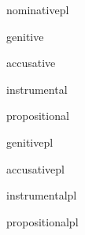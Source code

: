 \newcommand*\glstextfoot[1]{\glstext{#1}\footnote{\glstext{#1} --- \glsdesc{#1}.}}

\glsaddkey%
{nominativepl}%
{}%
{\glsentrynominativepl}%
{\Glsentrynominativepl}%
{\glsnompl}%
{\Glsnompl}%
{\GLSnompl}%

\glsaddkey%
{genitive}%
{}%
{\glsentrygenitive}%
{\Glsentrygenitive}%
{\glsgen}%
{\Glsgen}%
{\GLSgen}%

\glsaddkey%
{accusative}%
{}%
{\glsentryaccusative}%
{\Glsentryaccusative}%
{\glsacc}%
{\Glsacc}%
{\GLSacc}%

\glsaddkey%
{instrumental}%
{}%
{\glsentryinstrumental}%
{\Glsentryinstrumental}%
{\glsinstr}%
{\Glsinstr}%
{\GLSinstr}%

\glsaddkey%
{propositional}%
{}%
{\glsentrypropositional}%
{\Glsentrypropositional}%
{\glsprop}%
{\Glsprop}%
{\GLSprop}%

\glsaddkey%
{genitivepl}%
{}%
{\glsentrygenitivepl}%
{\Glsentrygenitivepl}%
{\glsgenpl}%
{\Glsgenpl}%
{\GLSgenpl}%

\glsaddkey%
{accusativepl}%
{}%
{\glsentryaccusativepl}%
{\Glsentryaccusativepl}%
{\glsaccpl}%
{\Glsaccpl}%
{\GLSaccpl}%

\glsaddkey%
{instrumentalpl}%
{}%
{\glsentryinstrumentalpl}%
{\Glsentryinstrumentalpl}%
{\glsinstrpl}%
{\Glsinstrpl}%
{\GLSinstrpl}%

\glsaddkey%
{propositionalpl}%
{}%
{\glsentrypropositionalpl}%
{\Glsentrypropositionalpl}%
{\glsproppl}%
{\Glsproppl}%
{\GLSproppl}%

\newcommand\glsform[2][glsdesc]{%
  \ifglsused{#2}%
  {\glsdisp{#2}{\glstext{#2}}}%
  {\glsdisp{#2}{\csname#1\endcsname{#2} (\glstext{#2})}}%
}

